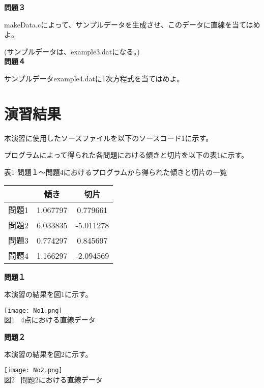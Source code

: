 \documentclass[a4]{jarticle}
\begin{document}
{\bf 問題３}

makeData.cによって、サンプルデータを生成させ、このデータに直線を当てはめよ。

(サンプルデータは、example3.datになる。)　\\

{\bf 問題４}

サンプルデータexample4.datに1次方程式を当てはめよ。

\section{演習結果}

本演習に使用したソースファイルを以下のソースコード1に示す。

  

プログラムによって得られた各問題における傾きと切片を以下の表1に示す。

\begin{table}[h]
\begin{center}
表1 問題１〜問題4におけるプログラムから得られた傾きと切片の一覧　\\
\begin{tabular}{|l|c|c|} \hline
\ & 傾き & 切片　\\ \hline 
問題1 & 1.067797 & 0.779661 \\ \hline
問題2 & 6.033835 & -5.011278 \\ \hline
問題3 & 0.774297 & 0.845697 \\ \hline
問題4 & 1.166297 & -2.094569 \\ \hline
\end{tabular}
\end{center}
\end{table}


{\bf 問題１}

本演習の結果を図1に示す。 \\

\begin{center}
\texttt{[image: No1.png]} \\
図1 \ 4点における直線データ
\end{center}

{\bf 問題２}

本演習の結果を図2に示す。

\begin{center}
\texttt{[image: No2.png]} \\
図2 \ 問題2における直線データ
\end{center}
\end{document}
